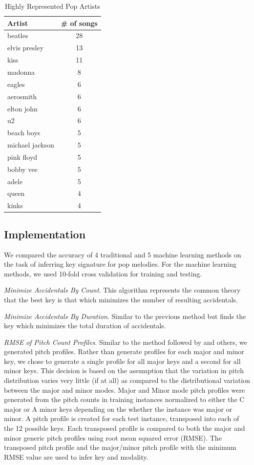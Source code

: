\documentclass[letterpaper]{article}
\begin{document}
\begin{table}[]
\centering
\caption{Highly Represented Pop Artists}
\label{tab:data_summary}
\begin{tabular}{@{}lc@{}}
\toprule
Artist & \# of songs\\ \midrule
beatles	& 28 \\
elvis presley	& 13 \\
kiss	&	11 \\
madonna	&	8 \\
eagles	&	6 \\
aerosmith	&	6 \\
elton john	&	6 \\
u2	&	6 \\
beach boys	&	5 \\
michael jackson	&	5 \\
pink floyd	&	5 \\
bobby vee		&	5 \\
adele	&	5 \\
queen	&	4 \\
kinks		&	4 \\
\end{tabular}
\end{table}

\subsection{Implementation}

We compared the accuracy of 4 traditional and 5 machine learning methods on the task of inferring key signature for pop melodies. For the machine learning methods, we used 10-fold cross validation for training and testing.

\emph{Minimize Accidentals By Count}. This algorithm represents the common theory that the best key is that which minimizes the number of resulting accidentals.

\emph{Minimize Accidentals By Duration}. Similar to the previous method but finds the key which minimizes the total duration of accidentals.

\emph{RMSE of Pitch Count Profiles}. Similar to the method followed by \cite{krumhansl2001cognitive} and others, we generated pitch profiles. Rather than generate profiles for each major and minor key, we chose to generate a single profile for all major keys and a second for all minor keys. This decision is based on the assumption that the variation in pitch distribution varies very little (if at all) as compared to the distributional variation between the major and minor modes. Major and Minor mode pitch profiles were generated from the pitch counts in training instances normalized to either the C major or A minor keys depending on the whether the instance was major or minor. A pitch profile is created for each test instance, transposed into each of the 12 possible keys. Each transposed profile is compared to both the major and minor generic pitch profiles using root mean squared error (RMSE). The transposed pitch profile and the major/minor pitch profile with the minimum RMSE value are used to infer key and modality.
\end{document}

